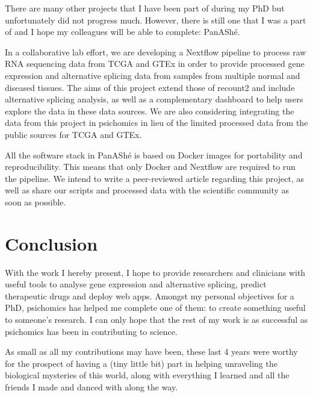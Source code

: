 There are many other projects that I have been part of during my PhD but unfortunately did not progress much. However, there is still one that I was a part of and I hope my colleagues will be able to complete: PanAShé.

In a collaborative lab effort, we are developing a Nextflow pipeline to process raw RNA sequencing data from TCGA \cite{chang:2013ww} and GTEx \cite{lonsdale:2013uo} in order to provide processed gene expression and alternative splicing data from samples from multiple normal and diseased tissues. The aims of this project extend those of recount2 \cite{collado-torres:2017uw} and include alternative splicing analysis, as well as a complementary dashboard to help users explore the data in these data sources. We are also considering integrating the data from this project in psichomics in lieu of the limited processed data from the public sources for TCGA and GTEx.

All the software stack in PanAShé is based on Docker images for portability and reproducibility. This means that only Docker and Nextflow are required to run the pipeline. We intend to write a peer-reviewed article regarding this project, as well as share our scripts and processed data with the scientific community as soon as possible.

\section{Conclusion}

With the work I hereby present, I hope to provide researchers and clinicians with useful tools to analyse gene expression and alternative splicing, predict therapeutic drugs and deploy web apps. Amongst my personal objectives for a PhD, psichomics has helped me complete one of them: to create something useful to someone's research. I can only hope that the rest of my work is as successful as psichomics has been in contributing to science.

As small as all my contributions may have been, these last 4 years were worthy for the prospect of having a (tiny little bit) part in helping unraveling the biological mysteries of this world, along with everything I learned and all the friends I made and danced with along the way.
